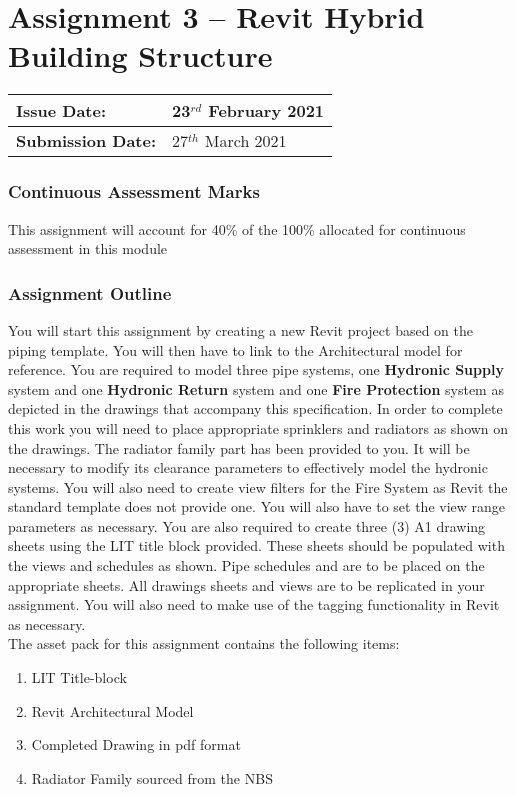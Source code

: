 
	
\part*{Assignment 3 – Revit Hybrid Building Structure}

\begin{tabularx}{\textwidth}{ |X|X| }
	\hline
	\textbf{Issue Date:} & 23$^{rd}$ February 2021 \\
	\hline 
	\textbf{Submission Date:}  & 27$^{th}$ March 2021   \\
	\hline
\end{tabularx}


\section*{Continuous Assessment Marks}
This assignment will account for 40\% of the 100\% allocated for continuous assessment in this module

\section*{Assignment Outline}
You will start this assignment by creating a new Revit project based on the piping template. You will then have to link to the Architectural model for reference.  You are required to model three pipe systems, one \textbf{Hydronic Supply} system and one \textbf{Hydronic Return} system and one \textbf{Fire Protection} system as depicted in the drawings that accompany this specification. In order to complete this work you will need to place appropriate sprinklers and radiators as shown on the drawings. The radiator family part has been provided to you. It will be necessary to modify its clearance parameters to effectively model the hydronic systems.  You will also need to create view filters for the Fire System as Revit the standard template does not provide one. You will also have to set the view range parameters as necessary.  You are also required to create three (3) A1 drawing sheets using the LIT title block provided. These sheets should be populated with the views and schedules as shown.  Pipe schedules and are to be placed on the appropriate sheets. All drawings sheets and views are to be replicated in your assignment. You will also need to make use of the tagging functionality in Revit as necessary.\\

The asset pack for this assignment contains the following items:
\begin{enumerate}
	\item LIT Title-block
	\item Revit Architectural Model
	\item Completed Drawing in pdf format
	\item Radiator Family sourced from the NBS
\end{enumerate}


